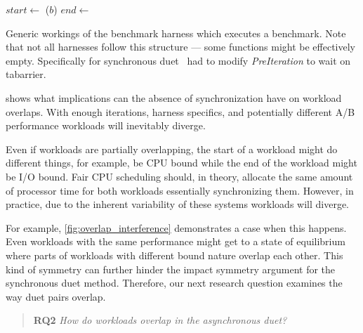 \begin{algorithm}
\begin{algorithmic}
		\State {}
		 	\State {}
			\State $start \gets$ 
			\State {}($b$)
			\State $end \gets$ 
			\State {}
		\EndFor
		\State {}
		\State {}
	\EndFunction
\end{algorithmic}
\caption{
	Generic workings of the benchmark harness which executes a benchmark.
	Note that not all harnesses follow this structure --- some functions might be effectively empty.
	Specifically for synchronous duet~\citet{bulej2020duet} had to modify \emph{PreIteration} to wait on tabarrier.
}
\label{alg:harness}
\end{algorithm}

 shows what implications can the absence of synchronization have on workload overlaps.
With enough iterations, harness specifics, and potentially different A/B performance workloads will inevitably diverge.

Even if workloads are partially overlapping, the start of a workload might do different things, for example, be CPU bound while the end of the workload might be I/O bound.
Fair CPU scheduling should, in theory, allocate the same amount of processor time for both workloads essentially synchronizing them.
However, in practice, due to the inherent variability of these systems workloads will diverge.

For example, \cref{fig:overlap_interference} demonstrates a case when this happens.
Even workloads with the same performance might get to a state of equilibrium where parts of workloads with different bound nature overlap each other.
This kind of symmetry can further hinder the impact symmetry argument for the synchronous duet method.
Therefore, our next research question examines the way duet pairs overlap.

\begin{quote}
	\textbf{RQ2} \emph{How do workloads overlap in the asynchronous duet?}
\end{quote}

